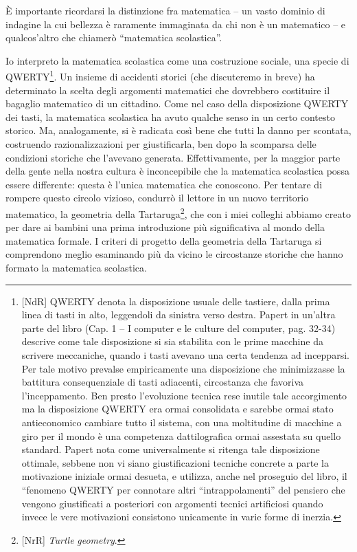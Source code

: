 È importante ricordarsi la distinzione fra matematica – un vasto dominio di indagine la cui bellezza è raramente immaginata da chi non è un matematico – e qualcos'altro che chiamerò “matematica scolastica”. 

Io interpreto la matematica scolastica come una costruzione sociale, una specie di QWERTY\footnote{[NdR] QWERTY denota la disposizione usuale delle tastiere, dalla prima linea di tasti in alto, leggendoli da sinistra verso destra. Papert in un'altra parte del libro (Cap. 1 – I computer e le culture del computer, pag. 32-34) descrive come tale disposizione si sia stabilita con le prime macchine da scrivere meccaniche, quando i tasti avevano una certa tendenza ad incepparsi. Per tale motivo prevalse empiricamente una disposizione che minimizzasse la battitura consequenziale di tasti adiacenti, circostanza che favoriva l'inceppamento. Ben presto l'evoluzione tecnica rese inutile tale accorgimento ma la disposizione QWERTY era ormai consolidata e sarebbe ormai stato antieconomico cambiare tutto il sistema, con una moltitudine di macchine a giro per il mondo è una competenza dattilografica ormai assestata su quello standard. Papert nota come universalmente si ritenga tale disposizione ottimale, sebbene non vi siano giustificazioni tecniche concrete a parte la motivazione iniziale ormai desueta, e utilizza, anche nel proseguio del libro, il “fenomeno QWERTY per connotare altri “intrappolamenti” del pensiero che vengono giustificati a posteriori con argomenti tecnici artificiosi quando invece le vere motivazioni consistono unicamente in varie forme di inerzia.}. Un insieme di accidenti storici (che discuteremo in breve) ha determinato la scelta degli argomenti matematici che dovrebbero costituire il bagaglio matematico di un cittadino. Come nel caso della disposizione QWERTY  dei tasti, la matematica scolastica ha avuto qualche senso in un certo contesto storico. Ma, analogamente, si è radicata così bene che tutti la danno per scontata, costruendo razionalizzazioni  per giustificarla, ben dopo la scomparsa delle condizioni storiche che l'avevano generata. Effettivamente, per la maggior parte della gente nella nostra cultura è inconcepibile che la matematica scolastica possa essere differente: questa è l'unica matematica che conoscono. Per tentare di rompere questo circolo vizioso, condurrò il lettore in un nuovo territorio matematico, la geometria della Tartaruga\footnote{[NrR] \textit{Turtle} \textit{geometry}.}, che con i miei colleghi abbiamo creato per dare ai bambini una prima introduzione più significativa al mondo della matematica formale. I criteri di progetto della geometria della Tartaruga si comprendono meglio esaminando più da vicino le circostanze storiche che hanno formato la matematica scolastica.


